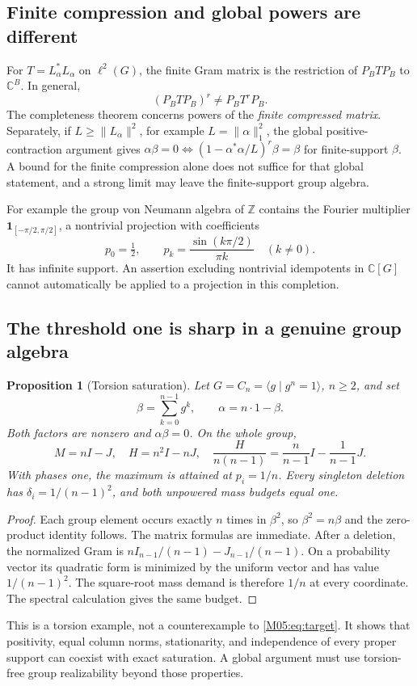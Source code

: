 \documentclass[11pt,a4paper,oneside]{report}
\newtheorem{proposition}[theorem]{Proposition}
\theoremstyle{definition}
\theoremstyle{remark}
\newcommand{\C}{\mathbb C}
\newcommand{\Z}{\mathbb Z}
\begin{document}
\subsection{Finite compression and global powers are different}
For $T=L_\alpha^*L_\alpha$ on $\ell^2(G)$, the finite Gram matrix
is the restriction of $P_BT P_B$ to $\C^B$. In general,
\[
 (P_BT P_B)^r\ne P_BT^rP_B.
\]
The completeness theorem concerns powers of the \emph{finite
compressed matrix}. Separately, if $L\ge\|L_\alpha\|^2$, for example
$L=\|\alpha\|_1^2$, the global positive-contraction argument gives
$\alpha\beta=0\iff(1-\alpha^*\alpha/L)^r\beta=\beta$ for
finite-support $\beta$. A bound for the finite compression alone
does not suffice for that global statement, and a strong limit
may leave the finite-support group algebra.

For example the group von Neumann algebra of $\Z$ contains the
Fourier multiplier $\mathbf1_{[-\pi/2,\pi/2]}$, a nontrivial
projection with coefficients
\[
 p_0=\tfrac12,\qquad
 p_k=\frac{\sin(k\pi/2)}{\pi k}\quad(k\ne0).
\]
It has infinite support. An assertion excluding nontrivial
idempotents in $\C[G]$ cannot automatically be applied to a
projection in this completion.

\subsection{The threshold one is sharp in a genuine group algebra}
\begin{proposition}[Torsion saturation]\label{M05:prop:torsion}
Let $G=C_n=\langle g\mid g^n=1\rangle$, $n\ge2$, and set
\[
 \beta=\sum_{k=0}^{n-1}g^k,\qquad \alpha=n\cdot1-\beta.
\]
Both factors are nonzero and $\alpha\beta=0$. On the whole group,
\[
 M=nI-J,\quad H=n^2I-nJ,\quad
 \frac{H}{n(n-1)}=\frac n{n-1}I-\frac1{n-1}J .
\]
With phases one, the maximum is attained at $p_i=1/n$.
Every singleton deletion has
$\delta_i=1/(n-1)^2$, and both unpowered mass budgets equal one.
\end{proposition}
\begin{proof}
Each group element occurs exactly $n$ times in $\beta^2$, so
$\beta^2=n\beta$ and the zero-product identity follows.
The matrix formulas are immediate. After a deletion, the
normalized Gram is
$nI_{n-1}/(n-1)-J_{n-1}/(n-1)$.
On a probability vector its quadratic form is minimized by the
uniform vector and has value $1/(n-1)^2$.
The square-root mass demand is therefore $1/n$ at every coordinate.
The spectral calculation gives the same budget.
\end{proof}
This is a torsion example, not a counterexample to
\eqref{M05:eq:target}. It shows that positivity, equal column norms,
stationarity, and independence of every proper support can coexist
with exact saturation. A global argument must use torsion-free
group realizability beyond those properties.
\end{document}
